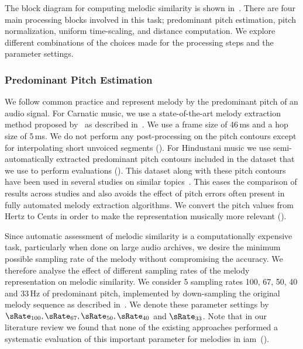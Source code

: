 The block diagram for computing melodic similarity is shown in~. There are four main processing blocks involved in this task; predominant pitch estimation, pitch normalization, uniform time-scaling, and distance computation. We explore different combinations of the choices made for the processing steps and the parameter settings.

\subsubsection{Predominant Pitch Estimation}
\label{sec:patterns_melodic_similarity_representation}

We follow common practice and represent melody by the predominant pitch of an audio signal. For Carnatic music, we use a state-of-the-art melody extraction method proposed by~\cite{Salamon2012} as described in~. We use a frame size of 46\,ms and a hop size of 5\,ms. We do not perform any post-processing on the pitch contours except for interpolating short unvoiced segments (). For Hindustani music we use semi-automatically extracted predominant pitch contours included in the dataset that we use to perform evaluations (). This dataset along with these pitch contours have been used in several studies on similar topics~\citep{Rao2014,Ross2012b,Ross2012}. This eases the comparison of results across studies and also avoids the effect of pitch errors often present in fully automated melody extraction algorithms. We convert the pitch values from Hertz to Cents in order to make the representation musically more relevant ().

Since automatic assessment of melodic similarity is a computationally expensive task, particularly when done on large audio archives, we desire the minimum possible sampling rate of the melody without compromising the accuracy. We therefore analyse the effect of different sampling rates of the melody representation on melodic similarity. We consider 5 sampling rates 100, 67, 50, 40 and 33\,Hz of predominant pitch, implemented by down-sampling the original melody sequence as described in~. We denote these parameter settings by $\sRate_{100}, \sRate_{67}, \sRate_{50}, \sRate_{40}$ and $\sRate_{33}$. Note that in our literature review we found that none of the existing approaches performed a systematic evaluation of this important parameter for melodies in \gls{iam}~().

